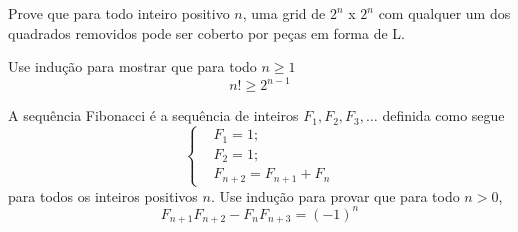 \begin{exercise}
	Prove que para todo inteiro positivo $n$, uma grid de $2^n$ x $2^n$ com qualquer um dos quadrados removidos pode ser coberto por peças em forma de L.
\end{exercise}

\begin{exercise}
	Use indução para mostrar que para todo $n \geq 1$
	$$
	n! \geq 2^{n - 1} 
	$$
\end{exercise}

\begin{exercise}
	A sequência Fibonacci é a sequência de inteiros $F_1, F_2, F_3,\ldots$ definida como segue
	$$
	\left\{
		\begin{aligned}
			&F_1 = 1;\\
			&F_2 = 1;\\
			&F_{n + 2} = F_{n + 1} + F_n
		\end{aligned}
	\right.
	$$
	para todos os inteiros positivos $n$. Use indução para provar que para todo $n > 0$,
	$$
	F_{n + 1} F_{n + 2} - F_n F_{n + 3} = (-1)^n
	$$
\end{exercise}
